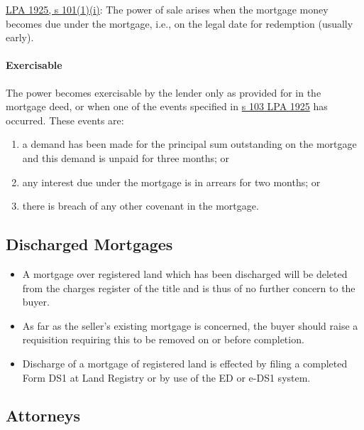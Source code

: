 \documentclass[
]{article}
\providecommand{\tightlist}{%
  \setlength{\itemsep}{0pt}\setlength{\parskip}{0pt}}
\begin{document}
\href{https://www.legislation.gov.uk/ukpga/Geo5/15-16/20/section/101}{LPA
1925, s 101(1)(i)}: The power of sale arises when the mortgage money
becomes due under the mortgage, i.e., on the legal date for redemption
(usually early).

\hypertarget{exercisable}{%
\paragraph{Exercisable}\label{exercisable}}

The power becomes exercisable by the lender only as provided for in the
mortgage deed, or when one of the events specified in
\href{https://www.legislation.gov.uk/ukpga/Geo5/15-16/20/section/103}{s
103 LPA 1925} has occurred. These events are:

\begin{enumerate}
\tightlist
\item
  a demand has been made for the principal sum outstanding on the
  mortgage and this demand is unpaid for three months; or
\item
  any interest due under the mortgage is in arrears for two months; or
\item
  there is breach of any other covenant in the mortgage.
\end{enumerate}

\hypertarget{discharged-mortgages}{%
\subsection{Discharged Mortgages}\label{discharged-mortgages}}

\begin{itemize}
\tightlist
\item
  A mortgage over registered land which has been discharged will be
  deleted from the charges register of the title and is thus of no
  further concern to the buyer.
\item
  As far as the seller's existing mortgage is concerned, the buyer
  should raise a requisition requiring this to be removed on or before
  completion.
\item
  Discharge of a mortgage of registered land is effected by filing a
  completed Form DS1 at Land Registry or by use of the ED or e-DS1
  system.
\end{itemize}

\hypertarget{attorneys}{%
\subsection{Attorneys}\label{attorneys}}
\end{document}
